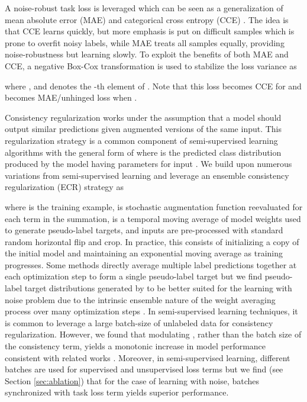\documentclass{article}
\begin{document}
A noise-robust task loss is leveraged which can be seen as a generalization of mean absolute error (MAE) and categorical cross entropy (CCE) \cite{zhang2018}.  The idea is that CCE learns quickly, but more emphasis is put on difficult samples which is prone to overfit noisy labels, while MAE treats all samples equally, providing noise-robustness but learning slowly.  To exploit the benefits of both MAE and CCE, a negative Box-Cox transformation \cite{10.2307/2984418} is used to stabilize the loss variance as
  
where , and  denotes the -th element of .  Note that this loss becomes CCE for  and becomes MAE/unhinged loss when .

Consistency regularization works under the assumption that a model should output similar predictions given augmented versions of the same input. This regularization strategy is a common component of semi-supervised learning algorithms with the general form of  where  is the predicted class distribution produced by the model having parameters  for input  \cite{7780854, sajjadi2016}.  We build upon numerous variations from semi-supervised learning \cite{laine2017, tarvainen2017, 48557, Berthelot2020ReMixMatch:} and leverage an ensemble consistency regularization (ECR) strategy as

where  is the training example,  is stochastic augmentation function reevaluated for each term in the summation,  is a temporal moving average of model weights used to generate pseudo-label targets, and inputs are pre-processed with standard random horizontal flip and crop.  In practice, this consists of initializing a copy of the initial model and maintaining an exponential moving average as training progresses.  Some methods directly average multiple label predictions together at each optimization step to form a single pseudo-label target \cite{48557,li2020} but we find pseudo-label target distributions generated by  to be better suited for the learning with noise problem due to the intrinsic ensemble nature of the weight averaging process over many optimization steps \cite{tarvainen2017}.  In semi-supervised learning techniques, it is common to leverage a large batch-size of unlabeled data for consistency regularization.  However, we found that modulating , rather than the batch size of the consistency term, yields a monotonic increase in model performance consistent with related works \cite{Berthelot2020ReMixMatch:}.  Moreover, in semi-supervised learning, different batches are used for supervised and unsupervised loss terms but we find (see Section \ref{sec:ablation}) that for the case of learning with noise, batches synchronized with task loss term yields superior performance. 
\end{document}
